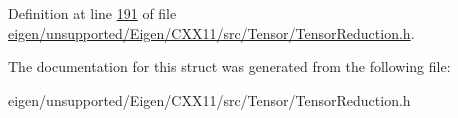 Definition at line \hyperlink{eigen_2unsupported_2_eigen_2_c_x_x11_2src_2_tensor_2_tensor_reduction_8h_source_l00191}{191} of file \hyperlink{eigen_2unsupported_2_eigen_2_c_x_x11_2src_2_tensor_2_tensor_reduction_8h_source}{eigen/unsupported/\+Eigen/\+C\+X\+X11/src/\+Tensor/\+Tensor\+Reduction.\+h}.



The documentation for this struct was generated from the following file\+:\begin{DoxyCompactItemize}
\item 
eigen/unsupported/\+Eigen/\+C\+X\+X11/src/\+Tensor/\+Tensor\+Reduction.\+h\end{DoxyCompactItemize}

